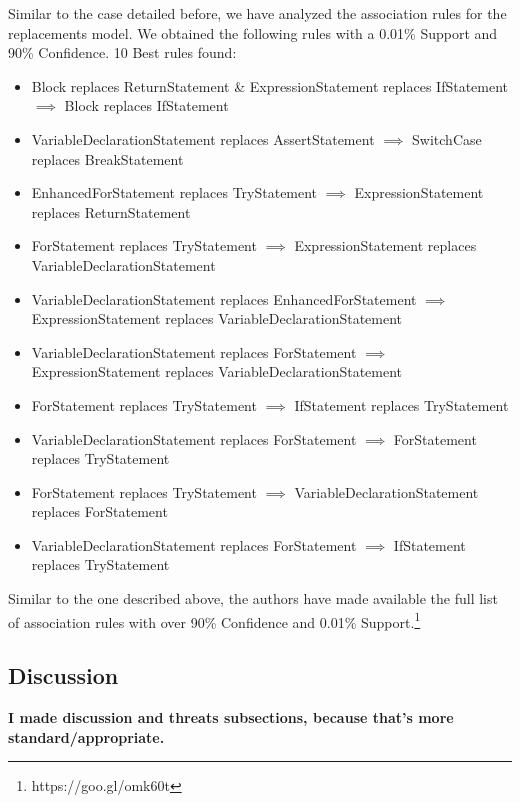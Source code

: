 \documentclass[conference]{IEEEtran}
\newcommand{\todo}[1]
  {{\scriptsize \textbf{\color{red} {#1}}}}
\begin{document}
Similar to the case detailed before, we have analyzed the association rules for the replacements model. We obtained the following rules with a 0.01\% Support and 90\% Confidence.
10 Best rules found:
\begin{itemize}
\item Block replaces ReturnStatement \& ExpressionStatement replaces IfStatement $\implies$ Block replaces IfStatement
\item VariableDeclarationStatement replaces AssertStatement $\implies$ SwitchCase replaces BreakStatement
\item EnhancedForStatement replaces TryStatement $\implies$ ExpressionStatement replaces ReturnStatement
\item ForStatement replaces TryStatement $\implies$ ExpressionStatement replaces VariableDeclarationStatement
\item VariableDeclarationStatement replaces EnhancedForStatement $\implies$ ExpressionStatement replaces VariableDeclarationStatement
\item VariableDeclarationStatement replaces ForStatement $\implies$ ExpressionStatement replaces VariableDeclarationStatement
\item ForStatement replaces TryStatement $\implies$ IfStatement replaces TryStatement
\item VariableDeclarationStatement replaces ForStatement $\implies$ ForStatement replaces TryStatement
\item ForStatement replaces TryStatement $\implies$ VariableDeclarationStatement replaces ForStatement
\item VariableDeclarationStatement replaces ForStatement $\implies$ IfStatement replaces TryStatement
\end{itemize}

Similar to the one described above, the authors have made available the full list of association rules with over 90\% Confidence and 0.01\% Support.\footnote{https://goo.gl/omk60t}

\subsection{Discussion} \label{discussion}
\todo{I made discussion and threats subsections, because that's more
  standard/appropriate.}
\end{document}
